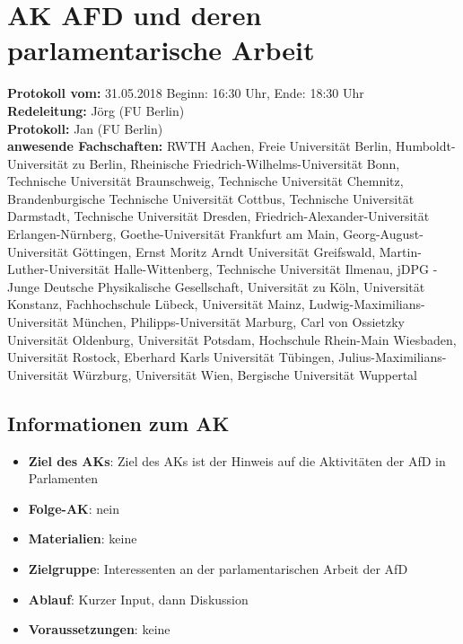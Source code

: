 
\section{AK AFD und deren parlamentarische Arbeit}

  \textbf{Protokoll vom:} 31.05.2018
  Beginn: 16:30 Uhr,
  Ende: 18:30 Uhr \\
  \textbf{Redeleitung:} Jörg (FU Berlin) \\
  \textbf{Protokoll:} Jan (FU Berlin) \\
  \textbf{anwesende Fachschaften:} RWTH Aachen, Freie Universität Berlin, Hum\-boldt-Universität zu Berlin, Rheinische Friedrich-Wilhelms-Universität Bonn, Technische Universität Braunschweig, Technische Universität Chemnitz, Brandenburgische Technische Universität Cottbus, Technische Universität Darmstadt, Technische Universität Dresden, Friedrich-Alexander-Universität Erlangen-Nürnberg, Goethe-Universität Frankfurt am Main, Georg-August-Universität Göttingen, Ernst Moritz Arndt Universität Greifswald, Martin-Luther-Universität Halle-Wittenberg, Technische Universität Ilmenau, jDPG - Junge Deutsche Physikalische Gesellschaft, Universität zu Köln, Universität Konstanz, Fachhochschule Lübeck, Universität Mainz, Ludwig-Maximilians-Universität München, Philipps-Universität Marburg, Carl von Ossietzky Universität Oldenburg, Universität Potsdam, Hochschule Rhein-Main Wiesbaden, Universität Rostock, Eberhard Karls Universität Tübingen, Julius-Maximilians-Universität Würzburg, Universität Wien, Bergische Universität Wuppertal
  \subsection*{Informationen zum AK}
    \begin{itemize}
    	\item \textbf{Ziel des AKs}: Ziel des AKs ist der Hinweis auf die Aktivitäten der AfD in Parlamenten
    	\item \textbf{Folge-AK}: nein
      \item \textbf{Materialien}: keine
    	\item \textbf{Zielgruppe}: Interessenten an der parlamentarischen Arbeit der AfD
    	\item \textbf{Ablauf}: Kurzer Input, dann Diskussion
    	\item \textbf{Voraussetzungen}: keine
    \end{itemize}

